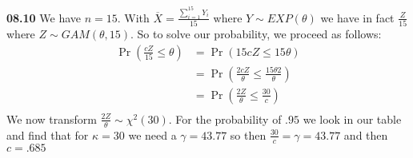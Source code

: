 
{\bf 08.10} We have $n = 15$. With $\overline{X} = \frac{\sum_{i=1}^{15} Y_i}{15}$ where $Y \sim EXP(\theta)$ we have
in fact $\frac{Z}{15}$ where $Z \sim GAM(\theta,15)$. So to solve our probability, we proceed as follows: \\

\begin{align*}
	\Pr \left( \frac{c Z}{15} \leq \theta \right) & = \Pr \left( 15 c Z  \leq 15 \theta \right) \\
	& = \Pr \left( \frac{ 2 c Z }{\theta} \leq \frac{15 \theta 2}{\theta} \right) \\
	& = \Pr \left( \frac{ 2 Z }{\theta} \leq \frac{30}{c} \right) \\
\end{align*}
We now transform $\frac{ 2 Z }{\theta} \sim \chi^2 (30)$. For the probability of $.95$ we look in our table and
find that for $\kappa = 30$ we need a $\gamma = 43.77$ so then $\frac{30}{c} = \gamma = 43.77$ and then $c = .685$ 
\\
